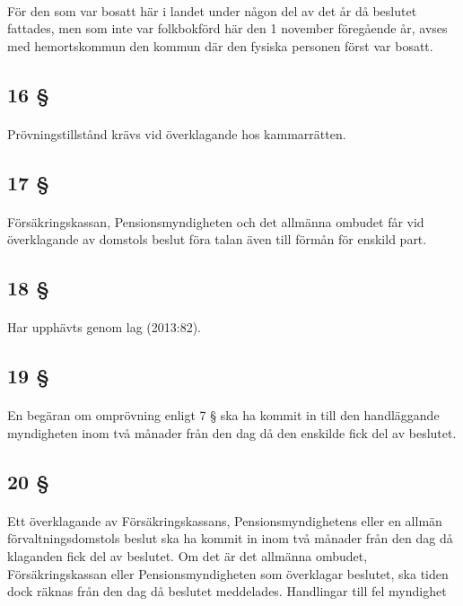 \documentclass[a4paper,notitlepage,openany,10pt]{book}
\begin{document}
\paragraph*{}
För den som var bosatt här i landet under någon del av det år då beslutet fattades, men som inte var folkbokförd här den 1 november föregående år, avses med hemortskommun den kommun där den fysiska personen först var bosatt.
\subsection*{16 §}
\paragraph*{}
Prövningstillstånd krävs vid överklagande hos kammarrätten.
\subsection*{17 §}
\paragraph*{}
Försäkringskassan, Pensionsmyndigheten och det allmänna ombudet får vid överklagande av domstols beslut föra talan även till förmån för enskild part.
\subsection*{18 §}
\paragraph*{}
Har upphävts genom
lag (2013:82).
\subsection*{19 §}
\paragraph*{}
En begäran om omprövning enligt 7 § ska ha kommit in till den handläggande myndigheten inom två månader från den dag då den enskilde fick del av beslutet.
\subsection*{20 §}
\paragraph*{}
Ett överklagande av Försäkringskassans, Pensionsmyndighetens eller en allmän förvaltningsdomstols beslut ska ha kommit in inom två månader från den dag då klaganden fick del av beslutet. Om det är det allmänna ombudet, Försäkringskassan eller Pensionsmyndigheten som överklagar beslutet, ska tiden dock räknas från den dag då beslutet meddelades.
Handlingar till fel myndighet
\end{document}
